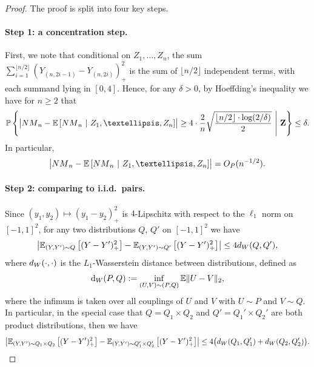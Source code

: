 \documentclass[12pt]{article}
\newcommand{\EEst}[2]{\mathbb{E}\left[{#1}\  \middle| \ {#2}\right]}
\newcommand{\Ep}[2]{\mathbb{E}_{{#1}}\left[{#2}\right]}
\newcommand{\PPst}[2]{\mathbb{P}\left\{{#1}\  \middle| \ {#2}\right\}}
\newcommand{\bZ}{\mathbf{Z}}
\begin{document}
\begin{proof}
The proof is split into four key steps.
\paragraph{Step 1: a concentration step.}
First, we note that conditional on $Z_1,\dots,Z_n$, the sum $\sum_{i=1}^{\lfloor n/2\rfloor}(Y_{(n,2i-1)} - Y_{(n,2i)})^2_+$ is the sum of $\lfloor n/2\rfloor$ independent terms, with each summand lying in $[0,4]$. Hence, for any $\delta>0$, by Hoeffding's inequality we have for $n \geq 2$ that 
\[
\PPst{\bigl|{\rm NM}_n - \EEst{{\rm NM}_n}{Z_1,\dots,Z_n}\bigr| \geq 4 \cdot \frac{2}{n}\sqrt{\frac{\lfloor n/2\rfloor  \cdot \log(2/\delta)}{2}}}{\bZ} \leq \delta.
\]
In particular,
\begin{equation}\label{eq:concentration-of-NM}
    \bigl|{\rm NM}_n - \EEst{{\rm NM}_n}{Z_1,\dots,Z_n}\bigr| = {\rm O}_P(n^{-1/2}).
\end{equation}
\paragraph{Step 2: comparing to i.i.d.\ pairs.}
Since $(y_1,y_2)\mapsto (y_1-y_2)^2_+$ is $4$-Lipschitz with respect to the $\ell_1$ norm on $[-1,1]^2$, for any two distributions $Q$, $Q'$ on $[-1,1]^2$ we have
\[\left|\Ep{(Y,Y')\sim Q}{(Y-Y')^2_+} - \Ep{(Y,Y')\sim Q'}{(Y-Y')^2_+}\right|\leq 4{\rm d}_{\rm W}(Q,Q'),\]
where ${\rm d}_{\rm W}(\cdot,\cdot)$ is the $L_1$-Wasserstein distance between distributions, defined as
\[
\mathrm{d}_{\rm W}(P,Q):= \inf_{(U,V) \sim (P,Q)} \mathbb{E}\|U-V\|_2,
\]
where the infimum is taken over all couplings of $U$ and $V$ with $U \sim P$ and $V \sim Q$.  In particular, in the special case that $Q=Q_1\times Q_2$ and $Q'=Q_1'\times Q_2'$ are both product distributions, then we have
\[\left|\Ep{(Y,Y')\sim Q_1\times Q_2}{(Y-Y')^2_+} - \Ep{(Y,Y')\sim Q'_1\times Q'_2}{(Y-Y')^2_+}\right|\leq 4 \bigl({\rm d}_{\rm W}(Q_1,Q'_1)+{\rm d}_{\rm W}(Q_2,Q'_2)\bigr).\]


\end{proof}
\end{document}
